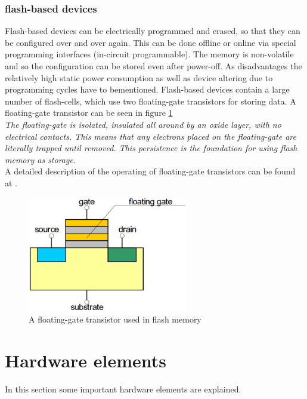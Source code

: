 \subsubsection{flash-based devices}
Flash-based devices can be electrically programmed and erased, so that they can be configured over and over again. This can be done offline or online via special programming interfaces (in-circuit programmable). The memory is non-volatile and so the configuration can be stored even after power-off. As disadvantages the relatively high static power consumption\cite{Qui16} as well as device altering due to programming cycles have to bementioned. Flash-based devices contain a large number of flash-cells, which use two floating-gate transistors for storing data. A floating-gate transistor can be seen in figure \ref{fig:FlashTransistor}\\
\textit{The floating-gate is isolated, insulated all around by an oxide layer, with no electrical contacts. This means that any electrons placed on the floating-gate are literally trapped until removed. This persistence is the foundation for using flash memory as storage.}\cite{Flash16}\\
A detailed description of the operating of floating-gate transistors can be found at \cite{Cse16}.\\

\begin{figure}[htbp]
\begin{center}
\includegraphics[width=7cm,keepaspectratio=true]{bilder/png/FlashTransistor}
\caption{A floating-gate transistor used in flash memory\cite{Core16}}
\label{fig:FlashTransistor}
\end{center}
\end{figure}
\section{Hardware elements}
In this section some important hardware elements are explained.
